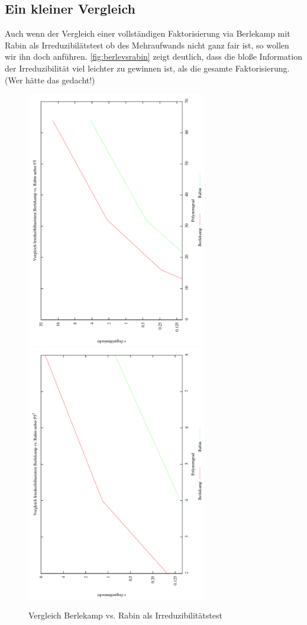 
\subsection{Ein kleiner Vergleich}

Auch wenn der Vergleich einer vollständigen Faktorisierung via Berlekamp mit
Rabin als Irreduzibilätstest ob des Mehraufwands nicht ganz fair ist, so wollen
wir ihn doch anführen. \autoref{fig:berlevsrabin} zeigt deutlich, 
dass die bloße Information der
Irreduzibilität viel leichter zu gewinnen ist, als die gesamte Faktorisierung.
(Wer hätte das gedacht!)

\begin{figure}
  \caption{Vergleich Berlekamp vs. Rabin als Irreduzibilitätstest}
  \label{fig:berlevsrabin}
  \centering
  \includegraphics[angle=-90,width=0.7\textwidth]{plots/benchBerleVsRabin_F5.pdf}
  \includegraphics[angle=-90,width=0.7\textwidth]{plots/benchBerleVsRabin_F53.pdf}
\end{figure}
